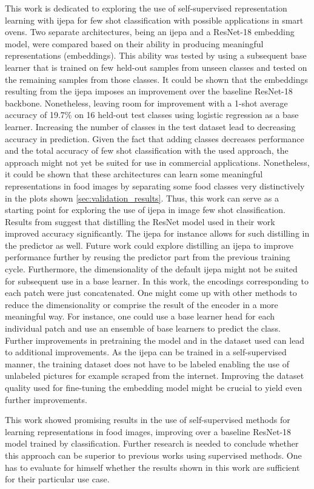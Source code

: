 This work is dedicated to exploring the use of self-supervised representation learning with \gls{ijepa} 
for few shot classification with possible applications in smart ovens. Two separate architectures, being 
an \gls{ijepa} and a ResNet-18 embedding model, were compared based on their ability in producing meaningful 
representations (embeddings). This ability was tested by using a subsequent base learner that is trained on 
few held-out samples from unseen classes and tested on the remaining samples from those classes. 
It could be shown that the embeddings resulting from the \gls{ijepa} imposes an improvement over the 
baseline ResNet-18 backbone. Nonetheless, leaving room for improvement with a 1-shot average accuracy of 19.7\% 
on 16 held-out test classes using logistic regression as a base learner. Increasing the number of classes 
in the test dataset lead to decreasing accuracy in prediction. Given the fact that adding classes decreases
performance and the total accuracy of few shot classification with the used approach, the approach might not yet 
be suited for use in commercial applications. Nonetheless, it could be shown that these architectures can 
learn some meaningful representations in food images by separating some food classes very distinctively in the plots shown 
\ref{sec:validation_results}. Thus, this work can serve as a starting point for exploring
the use of \gls{ijepa} in image few shot classification. Results from \cite{tian_rethinking_2020} suggest that 
distilling the ResNet model used in their work improved accuracy significantly. The \gls{ijepa} for instance allows
for such distilling in the predictor as well. Future work could explore distilling an \gls{ijepa} to improve performance
further by reusing the predictor part from the previous training cycle. Furthermore, the dimensionality of 
the default \gls{ijepa} might not be suited for subsequent use in a base learner. In this work, the encodings 
corresponding to each patch were just concatenated. One might come up with other methods to reduce the dimensionality
or comprise the result of the encoder in a more meaningful way. For instance, one could use a base learner 
head for each individual patch and use an ensemble of base learners to predict the class. 
Further improvements in pretraining the model and in the dataset used can lead to additional improvements. As the 
\gls{ijepa} can be trained in a self-supervised manner, the training dataset does not have to be labeled enabling 
the use of unlabeled pictures for example scraped from the internet. Improving the dataset quality used for fine-tuning 
the embedding model might be crucial to yield even further improvements.

This work showed promising results in the use of self-supervised methods for learning representations in food images, 
improving over a baseline ResNet-18 model trained by classification. Further research is needed to conclude whether this
approach can be superior to previous works using supervised methods. One has to evaluate for himself whether the results 
shown in this work are sufficient for their particular use case.
